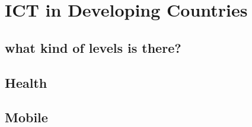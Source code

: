 \chapter{ICT in Developing Countries}
\section{what kind of levels is there?}
\section{Health}
\section{Mobile}